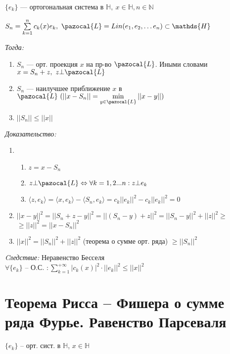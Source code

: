 \documentclass[paper=a4, fontsize=17pt]{article}
\begin{document}
$\{e_k\}$ {{---}} ортогональная система в $\mathds{H},\ x \in \mathds{H}, n \in \mathbb{N}$

$S_n = \sum\limits_{k=1}^{n} c_k(x)e_k,\ \pazocal{L} = Lin(e_1, e_2, \ldots e_n) \subset \mathds{H}$

\emph{Тогда:}

\begin{enumerate}

	\item $S_n$ {{---}} орт. проекция $x$ на пр-во $\pazocal{L}$. Иными словами $x = S_n + z,\ z \bot \pazocal{L}$

	\item $S_n$ {{---}} наилучшее приближение $x$ в $\pazocal{L}\ (||x - S_n|| = \min\limits_{y \in \pazocal{L}} ||x - y||)$

	\item $||S_n|| \leqslant ||x||$

\end{enumerate}

\emph{Доказательство:}

\begin{enumerate}

	\item
	\begin{enumerate}
		\item $z = x - S_n$

		\item $z \bot \pazocal{L} \Leftrightarrow \forall k = 1, 2 ...n : z \bot e_k$

		\item $\langle z, e_k \rangle = \langle x, e_k \rangle - \langle S_n, e_k \rangle = c_k ||e_k||^2 - c_k ||e_k||^2 = 0$
	\end{enumerate}

	\item $||x - y||^2 = ||S_n + z - y||^2 = ||(S_n - y) + z||^2 = ||S_n - y||^2 + ||z||^2 \geqslant$ $\geqslant ||z||^2 = ||x - S_n||^2$

	\item $||x||^2 = ||S_n||^2 + ||z||^2$ (теорема о сумме орт. ряда) $\geqslant ||S_n||^2$
\end{enumerate}

\emph{Cледствие:} Неравенство Бесселя\\

$\forall \{e_k\}$ {{--}} О.С. $:\sum\limits_{k=1}^{+\infty} |c_k(x)|^2 \cdot ||e_k||^2 \leqslant ||x||^2$

\section{Теорема Рисса -- Фишера о сумме ряда Фурье. Равенство Парсеваля}
$\{e_k\}$ -- орт. сист. в $\mathds{H}$, $x \in \mathds{H}$\\
\end{document}
